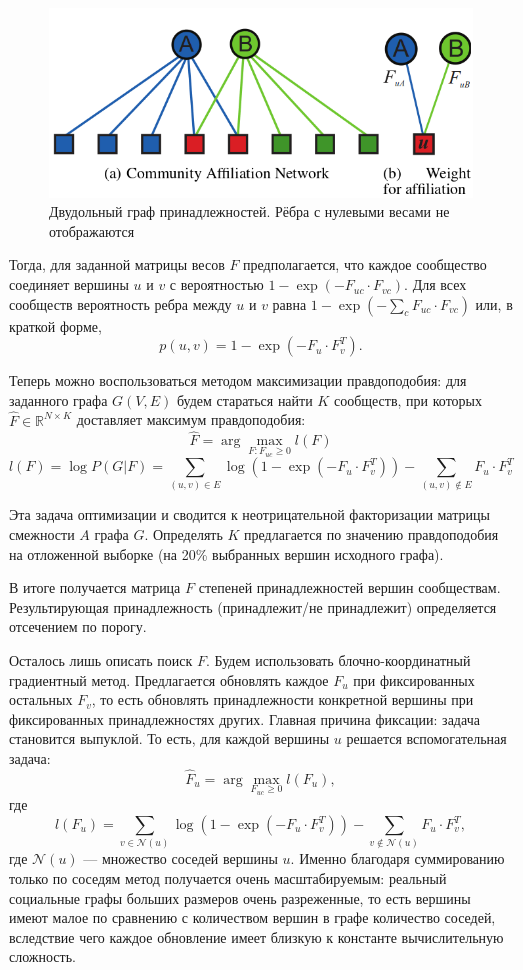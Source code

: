 \documentclass[12pt]{article}
\begin{document}
\begin{figure}[h]
	\begin{center}
		\includegraphics[scale=0.33]{pics/cluster_affiliation}
	\end{center}
	\caption{Двудольный граф принадлежностей. Рёбра с нулевыми весами не отображаются}
\end{figure}

Тогда, для заданной матрицы весов $F$ предполагается, что каждое сообщество соединяет вершины $u$ и $v$ с вероятностью $1 - \exp(-F_{uc}\cdot F_{vc})$. Для всех сообществ вероятность ребра между $u$ и $v$ равна $1 - \exp(-\sum_c F_{uc} \cdot F_{vc})$ или, в краткой форме,
\[
p(u, v) = 1 - \exp(-F_{u} \cdot F_{v}^T). 
\]

Теперь можно воспользоваться методом максимизации правдоподобия: для заданного графа $G(V, E)$ будем стараться найти $K$ сообществ, при которых $\hat F \in \mathbb{R}^{N \times K}$ доставляет максимум правдоподобия:
\[
\hat F = \arg\max_{F: F_{uc} \geq 0} l(F)
\]
\[
l(F) = \log P(G|F) = \sum\limits_{(u, v) \in E} \log (1 - \exp(-F_u \cdot F_v^T)) - \sum\limits_{(u, v) \notin E} F_u \cdot F_v^T
\]

Эта задача оптимизации и сводится к неотрицательной факторизации матрицы смежности $A$ графа $G$. Определять $K$ предлагается по значению правдоподобия на отложенной выборке (на 20\% выбранных вершин исходного графа). 

В итоге получается матрица $F$ степеней принадлежностей вершин сообществам. Результирующая принадлежность (принадлежит/не принадлежит) определяется отсечением по порогу.

Осталось лишь описать поиск $F$. Будем использовать блочно-координатный градиентный метод. Предлагается обновлять каждое $F_u$ при фиксированных остальных $F_v$, то есть обновлять принадлежности конкретной вершины при фиксированных принадлежностях других. Главная причина фиксации: задача становится выпуклой. То есть, для каждой вершины $u$ решается вспомогательная задача: 
\[
\hat F_u = \arg\max_{F_{uc} \geq 0} l(F_u),
\]
где
\[
l(F_u) = \sum\limits_{v \in \mathcal{N}(u)} \log (1 - \exp(-F_u \cdot F_v^T)) - \sum\limits_{v \notin \mathcal{N}(u)} F_u \cdot F_v^T,
\]
где $\mathcal{N}(u)$ --- множество соседей вершины $u$. Именно благодаря суммированию только по соседям метод получается очень масштабируемым: реальный социальные графы больших размеров очень разреженные, то есть вершины имеют малое по сравнению с количеством вершин в графе количество соседей, вследствие чего каждое обновление имеет близкую к константе вычислительную сложность.
\end{document}
